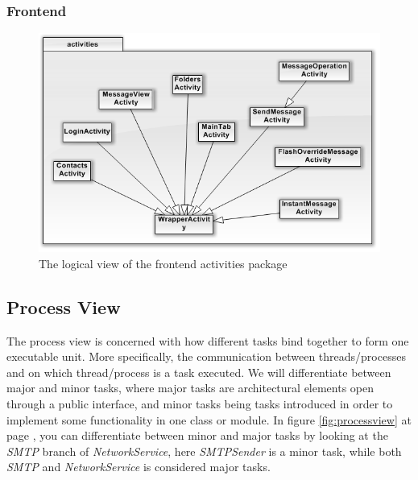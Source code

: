 \subsubsection{Frontend}
	\begin{figure}[H]
		\includegraphics[width=\textwidth]{FrontendClasses.png}
		\caption{The logical view of the frontend activities package}
		\label{fig:logicalfrontpackview}
	\end{figure}	
	
\subsection{Process View}
The process view is concerned with how different tasks bind together to form one executable unit. More specifically, the communication between threads/processes and on which thread/process is a task executed. We will differentiate between major and minor tasks, where major tasks are architectural elements open through a public interface, and minor tasks being tasks introduced in order to implement some functionality in one class or module.
In figure \ref{fig:processview} at page \pageref{fig:processview}, you can differentiate between minor and major tasks by looking at the \textit{SMTP} branch of \textit{NetworkService}, here \textit{SMTPSender} is a minor task, while both \textit{SMTP} and \textit{NetworkService} is considered major tasks. 

